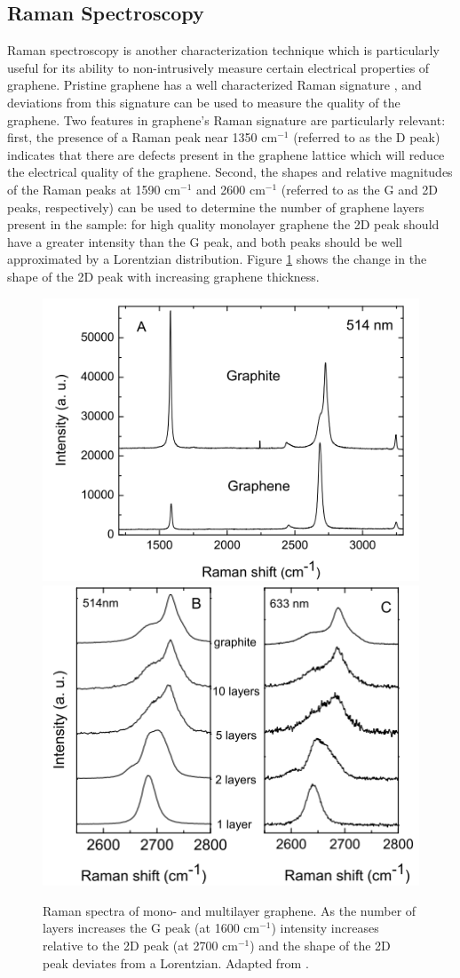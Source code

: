 \documentclass[edeposit,fullpage,draftthesis]{uiucthesis2009}
\begin{document}
        \subsection{Raman Spectroscopy}
        
        Raman spectroscopy is another characterization technique which is particularly useful for
        its ability to non-intrusively measure certain electrical properties of graphene.
        Pristine graphene has a well characterized Raman signature \cite{ferrari2006raman}, and deviations
        from this signature can be used to measure the quality of the graphene.
        Two features in graphene's Raman signature are particularly relevant: first, the presence of a 
        Raman peak near 1350 cm$^{-1}$ (referred to as the D peak) indicates that there are defects present in the graphene lattice
        which will reduce the electrical quality of the graphene. Second, the shapes and relative magnitudes
        of the Raman peaks at 1590 cm$^{-1}$ and 2600 cm$^{-1}$ (referred to as the G and 2D peaks, respectively)
        can be used to determine the number of graphene layers present in the sample: for high quality
        monolayer graphene the 2D peak should have a greater intensity than the G peak, and both peaks
        should be well approximated by a Lorentzian distribution. Figure \ref{fig:pristine_raman}
        shows the change in the shape of the 2D peak with increasing graphene thickness.
        
        \begin{figure}
            \centering
            \includegraphics[width=0.49\linewidth]{images/experimentaltechniques/pristine_raman_2.png}
            \includegraphics[width=0.49\linewidth]{images/experimentaltechniques/pristine_raman_1.png}
            \caption[Raman spectra of graphene]{
                Raman spectra of mono- and multilayer graphene. As the number of layers increases the G peak
                (at 1600 cm$^{-1}$) intensity increases relative to the 2D peak (at 2700 cm$^{-1}$) and the 
                shape of the 2D peak deviates from a Lorentzian.
                Adapted from \cite{ferrari2006raman}.
                }
            \label{fig:pristine_raman}
        \end{figure}
        
\end{document}
